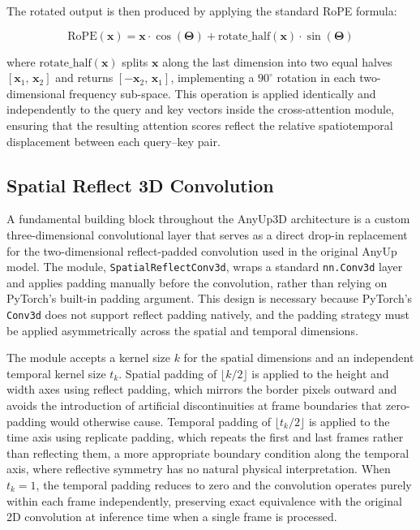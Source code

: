 The rotated output is then produced by applying the standard RoPE formula:

\begin{equation}
    \text{RoPE}(\mathbf{x}) = \mathbf{x} \cdot \cos(\symbf{\Theta}) + \text{rotate\_half}(\mathbf{x}) \cdot \sin(\symbf{\Theta})
\end{equation}

\noindent where $\text{rotate\_half}(\mathbf{x})$ splits $\mathbf{x}$ along the last dimension into two equal halves $[\mathbf{x}_1,\, \mathbf{x}_2]$ and returns $[-\mathbf{x}_2,\, \mathbf{x}_1]$, implementing a $90^\circ$ rotation in each two-dimensional frequency sub-space. This operation is applied identically and independently to the query and key vectors inside the cross-attention module, ensuring that the resulting attention scores reflect the relative spatiotemporal displacement between each query--key pair.

\subsection{Spatial Reflect 3D Convolution}
\label{sec:reflectconv}

A fundamental building block throughout the AnyUp3D architecture is a custom three-dimensional convolutional layer that serves as a direct drop-in replacement for the two-dimensional reflect-padded convolution used in the original AnyUp~\cite{anyup} model. The module, \texttt{SpatialReflectConv3d}, wraps a standard \texttt{nn.Conv3d} layer and applies padding manually before the convolution, rather than relying on PyTorch's built-in padding argument. This design is necessary because PyTorch's \texttt{Conv3d} does not support reflect padding natively, and the padding strategy must be applied asymmetrically across the spatial and temporal dimensions.

The module accepts a kernel size $k$ for the spatial dimensions and an independent temporal kernel size $t_k$. Spatial padding of $\lfloor k/2 \rfloor$ is applied to the height and width axes using reflect padding, which mirrors the border pixels outward and avoids the introduction of artificial discontinuities at frame boundaries that zero-padding would otherwise cause. Temporal padding of $\lfloor t_k/2 \rfloor$ is applied to the time axis using replicate padding, which repeats the first and last frames rather than reflecting them, a more appropriate boundary condition along the temporal axis, where reflective symmetry has no natural physical interpretation. When $t_k = 1$, the temporal padding reduces to zero and the convolution operates purely within each frame independently, preserving exact equivalence with the original 2D convolution at inference time when a single frame is processed.

